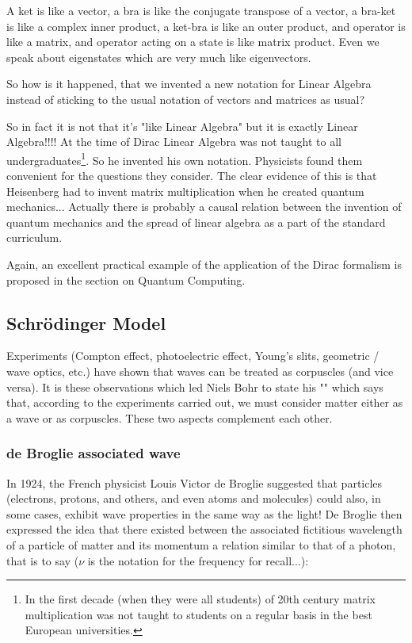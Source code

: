 	A ket is like a vector, a bra is like the conjugate transpose of a vector, a bra-ket is like a complex inner product, a ket-bra is like an outer product, and operator is like a matrix, and operator acting on a state is like matrix product. Even we speak about eigenstates which are very much like eigenvectors.

	So how is it happened, that we invented a new notation for Linear Algebra instead of sticking to the usual notation of vectors and matrices as usual?

	So in fact it is not that it's "like Linear Algebra" but it is exactly Linear Algebra!!!! At the time of Dirac Linear Algebra was not taught to all undergraduates\footnote{In the first decade (when they were all students) of 20th century matrix multiplication was not taught to students on a regular basis in the best European universities.}. So he invented his own notation. Physicists found them convenient for the questions they consider. The clear evidence of this is that Heisenberg had to invent matrix multiplication when he created quantum mechanics... Actually there is probably a causal relation between the invention of quantum mechanics and the spread of linear algebra as a part of the standard curriculum.
	
	\begin{tcolorbox}[title=Remark,colframe=black,arc=10pt]
	Again, an excellent practical example of the application of the Dirac formalism is proposed in the section on Quantum Computing.
	\end{tcolorbox}
	
	\subsection{Schrödinger Model}
	Experiments (Compton effect, photoelectric effect, Young's slits, geometric / wave optics, etc.) have shown that waves can be treated as corpuscles (and vice versa). It is these observations which led Niels Bohr to state his "" which says that, according to the experiments carried out, we must consider matter either as a wave or as corpuscles. These two aspects complement each other.
	
	\subsubsection{de Broglie associated wave}\label{de broglie associated wave}
	In 1924, the French physicist Louis Victor de Broglie suggested that particles (electrons, protons, and others, and even atoms and molecules) could also, in some cases, exhibit wave properties in the same way as the light! De Broglie then expressed the idea that there existed between the associated fictitious wavelength of a particle of matter and its momentum a relation similar to that of a photon, that is to say ($\nu$ is the notation for the frequency for recall...):
	
